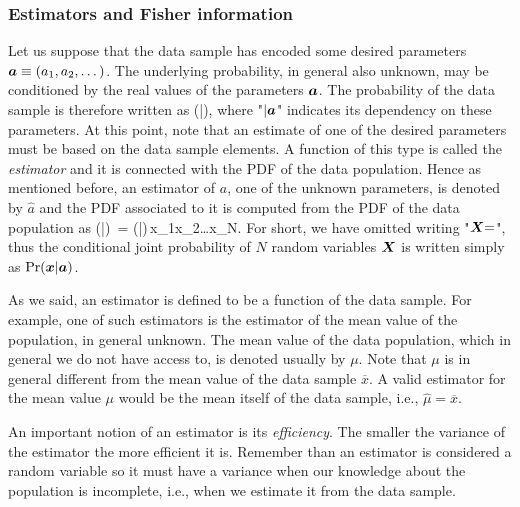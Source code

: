 \subsubsection{Estimators and Fisher information}
\label{sec:bg-estimators}

Let us suppose that the data sample has encoded some desired parameters $\boldsymbol{a}\equiv(a_1,a_2,\dots)$.
The underlying probability, in general also unknown, may be conditioned by the real values of the parameters $\boldsymbol{a}$.
The probability of the data sample is therefore written as
\be
  \prob(|),
\ee
where "$|\boldsymbol{a}$" indicates its dependency on these parameters.
At this point, note that an estimate of one of the desired parameters must be based on the data sample elements.
A function of this type is called the \emph{estimator} and it is connected with the PDF of the data population.
Hence as mentioned before, an estimator of $a$, one of the unknown parameters, is denoted by $\hat{a}$ and the PDF associated to it is computed from the PDF of the data population as
\be
  \prob(|)\, = \prob(|)\,x_1x_2\dots{}x_N.
\ee
For short, we have omitted writing "$\boldsymbol{X}{=}$", thus the conditional joint probability of $N$ random variables $\boldsymbol{X}$ is written simply as $\text{Pr}(\boldsymbol{x}|\boldsymbol{a})$.

As we said, an estimator is defined to be a function of the data sample.
For example, one of such estimators is the estimator of the mean value of the population, in general unknown.
The mean value of the data population, which in general we do not have access to, is denoted usually by $\mu$.
Note that $\mu$ is in general different from the mean value of the data sample $\overline{x}$.
A valid estimator for the mean value $\mu$ would be the mean itself of the data sample, i.e., $\hat{\mu}=\overline{x}$.

An important notion of an estimator is its \emph{efficiency}.
The smaller the variance of the estimator the more efficient it is.
Remember than an estimator is considered a random variable so it must have a variance when our knowledge about the population is incomplete, i.e., when we estimate it from the data sample.

